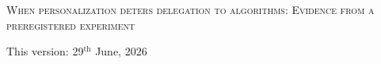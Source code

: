 \documentclass[a4paper, 12pt, fleqn]{article}
\title{\mytitle}
\date{}
\theoremstyle{definition}
\newcommand{\symbolfootnote}[1]{\begingroup%
\renewcommand{\thefootnote}{\fnsymbol{footnote}}\footnote{#1}\endgroup}
\newcommand{\mytitle}{{\Large \textsc{When personalization deters delegation to algorithms: Evidence from a preregistered experiment}}}
\begin{document}
 
\thispagestyle{empty}
\begin{center}
	\mytitle%
  \vspace{.55cm}\\
\begin{small}
\vspace{.6cm}
 {This version: 29$^{\text{th}}$ June, 2026}
\vspace{.6cm}
\end{small}
\end{center}
\end{document}
